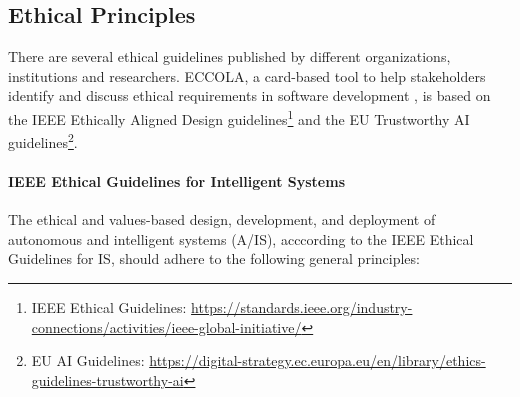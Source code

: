 \subsection{Ethical Principles}
There are several ethical guidelines published by different organizations, institutions and researchers. ECCOLA, a card-based tool to help stakeholders identify and discuss ethical requirements in software 
development \cite{VAKKURI2021111067}, is based on the IEEE Ethically Aligned Design guidelines\footnote{IEEE Ethical Guidelines: \url{https://standards.ieee.org/industry-connections/activities/ieee-global-initiative/}} and 
the EU Trustworthy AI guidelines\footnote{EU AI Guidelines: \url{https://digital-strategy.ec.europa.eu/en/library/ethics-guidelines-trustworthy-ai}}.

\paragraph{IEEE Ethical Guidelines for Intelligent Systems\\}
The ethical and values-based design, development, and deployment of autonomous and intelligent systems (A/IS), acccording to the IEEE Ethical Guidelines for IS, should adhere to the following general principles:

